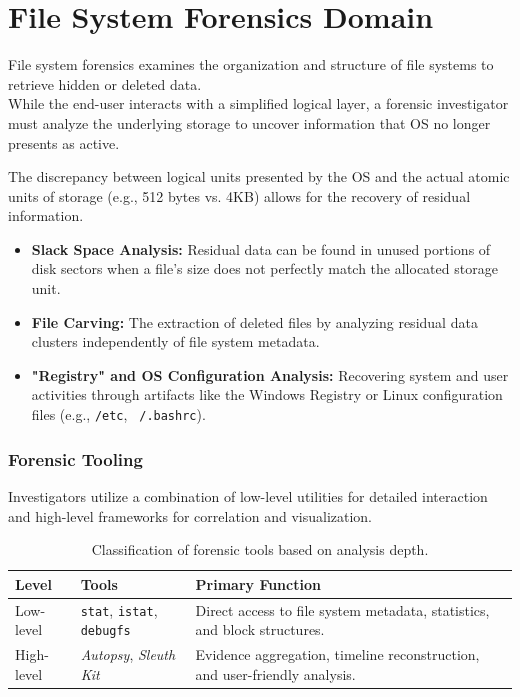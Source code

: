 \section{File System Forensics Domain}

File system forensics examines the organization and structure of file systems to retrieve hidden or deleted data. \\
While the end-user interacts with a simplified logical layer, a forensic investigator must analyze the underlying storage to uncover information that OS no longer presents as active. 
\bigskip

\noindent
The discrepancy between logical units presented by the OS and the actual atomic units of storage (e.g., 512 bytes vs. 4KB) allows for the recovery of residual information.

\begin{itemize}
    \item \textbf{Slack Space Analysis:} Residual data can be found in unused portions of disk sectors when a file's size does not perfectly match the allocated storage unit.
    \item \textbf{File Carving:} The extraction of deleted files by analyzing residual data clusters independently of file system metadata.
    \item \textbf{"Registry" and OS Configuration Analysis:} Recovering system and user activities through artifacts like the Windows Registry or Linux configuration files (e.g., \texttt{/etc}, \texttt{~/.bashrc}).
\end{itemize}

\subsubsection*{Forensic Tooling}
Investigators utilize a combination of low-level utilities for detailed interaction and high-level frameworks for correlation and visualization.

\begin{table}[H]
\centering
\small
\begin{tabular}{|l|l|p{5cm}|}
\hline
\textbf{Level} & \textbf{Tools} & \textbf{Primary Function} \\
\hline
Low-level & \texttt{stat}, \texttt{istat}, \texttt{debugfs} & Direct access to file system metadata, statistics, and block structures. \\
\hline
High-level & \textit{Autopsy}, \textit{Sleuth Kit} & Evidence aggregation, timeline reconstruction, and user-friendly analysis. \\
\hline
\end{tabular}
\caption{Classification of forensic tools based on analysis depth.}
\end{table}

